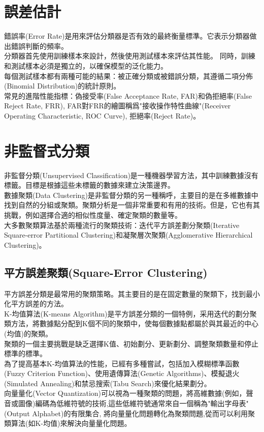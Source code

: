 \documentclass[10pt, a4paper]{article}
\begin{document}
\begin{CJK*}{UTF8}{bsmi}
\section{誤差估計}
錯誤率(Error Rate)是用來評估分類器是否有效的最終衡量標準。它表示分類器做出錯誤判斷的頻率。\\[0.5em]
分類器首先使用訓練樣本來設計，然後使用測試樣本來評估其性能。
同時，訓練和測試樣本必須是獨立的，以確保模型的泛化能力。\\[0.5em]
每個測試樣本都有兩種可能的結果：被正確分類或被錯誤分類，其遵循二項分佈(Binomial Distribution)的統計原則。\\[0.5em]
常見的進階性能指標：偽接受率(False Acceptance Rate, FAR)和偽拒絕率(False Reject Rate, FRR), FAR對FRR的繪圖稱爲"接收操作特性曲線"(Receiver Operating Characteristic, ROC Curve), 拒絕率(Reject Rate)。

\section{非監督式分類}
非監督分類(Unsupervised Classification)是一種機器學習方法，其中訓練數據沒有標籤。目標是根據這些未標籤的數據來建立決策邊界。\\[0.5em]
數據聚類(Data Clustering)是非監督分類的另一種稱呼，主要目的是在多維數據中找到自然的分組或聚類。聚類分析是一個非常重要和有用的技術。但是，它也有其挑戰，例如選擇合適的相似性度量、確定聚類的數量等。\\[0.5em]
大多數聚類算法基於兩種流行的聚類技術：迭代平方誤差劃分聚類(Iterative Square-error Partitional Clustering)和凝聚層次聚類(Agglomerative Hierarchical Clustering)。
\subsection{平方誤差聚類(Square-Error Clustering)}
平方誤差分類是最常用的聚類策略。其主要目的是在固定數量的聚類下，找到最小化平方誤差的方法。\\[0.5em]
K-均值算法(K-means Algorithm)是平方誤差分類的一個特例，采用迭代的劃分聚類方法，將數據點分配到K個不同的聚類中，使每個數據點都屬於與其最近的中心(均值)的聚類。\\[0.5em]
聚類的一個主要挑戰是缺乏選擇K值、初始劃分、更新劃分、調整聚類數量和停止標準的標準。\\[0.5em]
為了提高基本K-均值算法的性能，已經有多種嘗試，包括加入模糊標準函數(Fuzzy Criterion Function)、使用遺傳算法(Genetic Algorithms)、模擬退火(Simulated Annealing)和禁忌搜索(Tabu Search)來優化結果劃分。\\[0.5em]
向量量化(Vector Quantization)可以視為一種聚類的問題，將高維數據(例如，聲音或圖像)編碼為低維符號的技術,這些低維符號通常來自一個稱為"輸出字母表"(Output Alphabet)的有限集合, 將向量量化問題轉化為聚類問題,從而可以利用聚類算法(如K-均值)來解決向量量化問題。

\end{CJK*}
\end{document}

